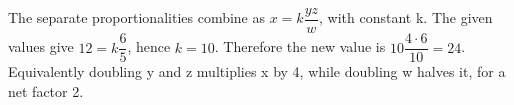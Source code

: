 The separate proportionalities combine as $x=k\dfrac{yz}{w}$, with constant k. The given values give $12=k\dfrac{6}{5}$, hence $k=10$. Therefore the new value is $10\dfrac{4\cdot 6}{10}=\boxed{24}$. Equivalently doubling y and z multiplies x by 4, while doubling w halves it, for a net factor 2.
